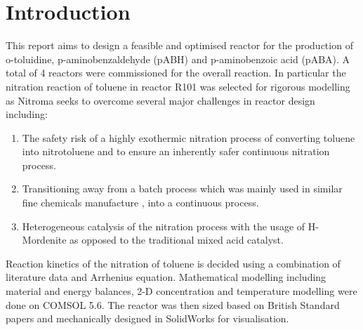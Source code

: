 \section{Introduction}
This report aims to design a feasible and optimised reactor for the production of o-toluidine, p-aminobenzaldehyde (pABH) and p-aminobenzoic acid (pABA). A total of 4 reactors were commissioned for the overall reaction. 
In particular the nitration reaction of toluene in reactor R101 was selected for rigorous modelling as Nitroma seeks to overcome several major challenges in reactor design including:

\begin{enumerate}
    \item The safety risk of a highly exothermic nitration process of converting toluene into nitrotoluene and to ensure an inherently safer continuous nitration process. 
    \item Transitioning away from a batch process which was mainly used in similar fine chemicals manufacture \cite{di_miceli_raimondi_safety_2015}, into a continuous process. 
    \item Heterogeneous catalysis of the nitration process with the usage of H-Mordenite as opposed to the traditional mixed acid catalyst. 
\end{enumerate}

Reaction kinetics of the nitration of toluene is decided using a combination of literature data and Arrhenius equation. Mathematical modelling including material and energy balances, 2-D concentration and temperature modelling were done on COMSOL 5.6. The reactor was then sized based on British Standard papers and mechanically designed in SolidWorks for visualisation.


